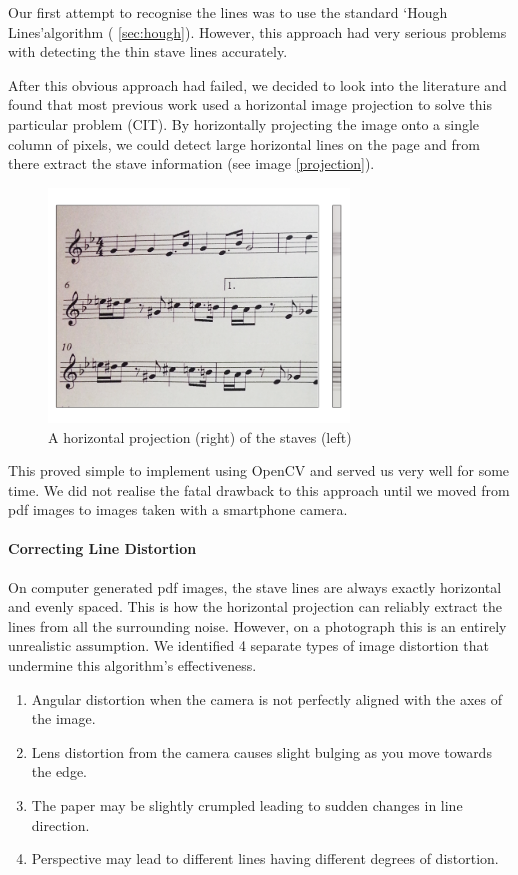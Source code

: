 Our first attempt to recognise the lines was to use the standard \lq Hough Lines\rq  algorithm ( \autoref{sec:hough}). However, this approach had very serious problems with detecting the thin stave lines accurately.

After this obvious approach had failed, we decided to look into the literature and found that most previous work used a horizontal image projection to solve this particular problem (CIT). By horizontally projecting the image onto a single column of pixels, we could detect large horizontal lines on the page and from there extract the stave information (see image \ref{projection}).

\begin{figure}[h!]
    \centering
    \includegraphics[width=80mm]{./assets/projection.png}
    \caption{A horizontal projection (right) of the staves (left)}
    \label{image:projection}
\end{figure}

This proved simple to implement using OpenCV and served us very well for some time. We did not realise the fatal drawback to this approach until we moved from pdf images to images taken with a smartphone camera. 

\paragraph{Correcting Line Distortion}

On computer generated pdf images, the stave lines are always exactly horizontal and evenly spaced. This is how the horizontal projection can reliably extract the lines from all the surrounding noise. However, on a photograph this is an entirely unrealistic assumption. We identified 4 separate types of image distortion that undermine this algorithm's effectiveness.

\begin{enumerate}
\item{Angular distortion when the camera is not perfectly aligned with the axes of the image.}
\item{Lens distortion from the camera causes slight bulging as you move towards the edge.}
\item{The paper may be slightly crumpled leading to sudden changes in line direction.}
\item{Perspective may lead to different lines having different degrees of distortion.}
\end{enumerate}

